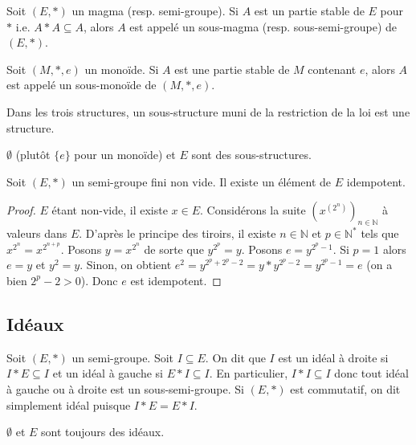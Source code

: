 \begin{definition}
Soit $(E, *)$ un magma (resp. semi-groupe).
Si $A$ est un partie stable de $E$ pour $*$ i.e. $A * A \subseteq A$,
alors $A$ est appelé un sous-magma (resp. sous-semi-groupe) de $(E, *)$.

Soit $(M, *, e)$ un monoïde.
Si $A$ est une partie stable de $M$ contenant $e$,
alors $A$ est appelé un sous-monoïde de $(M, *, e)$.

Dans les trois structures, un sous-structure muni de la restriction de la loi est une structure.
\end{definition}

\begin{exemple}
$\emptyset$ (plutôt $\{e\}$ pour un monoïde) et $E$ sont des sous-structures.
\end{exemple}

\begin{proposition}
Soit $(E, *)$ un semi-groupe fini non vide.
Il existe un élément de $E$ idempotent.
\end{proposition}

\begin{proof}
$E$ étant non-vide, il existe $x \in E$.
Considérons la suite $\left(x^{(2^n)}\right)_{n \in \mathbb{N}}$ à valeurs dans $E$.
D'après le principe des tiroirs, il existe $n \in \mathbb{N}$ et $p \in \mathbb{N}^*$ tels que
$x^{2^n} = x^{2^{n+p}}$.
Posons $y = x^{2^n}$ de sorte que $y^{2^p} = y$.
Posons $e = y^{2^p - 1}$.
Si $p = 1$ alors $e = y$ et $y^2 = y$.
Sinon, on obtient $e^2 = y^{2^p + 2^p - 2} = y * y^{2^p - 2} = y^{2^p - 1} = e$
(on a bien $2^p - 2 > 0$).
Donc $e$ est idempotent.
\end{proof}


\subsection{Idéaux}

\begin{definition}[Idéal]
Soit $(E, *)$ un semi-groupe.
Soit $I \subseteq E$. On dit que $I$ est
un idéal à droite si $I * E \subseteq I$
et un idéal à gauche si $E * I \subseteq I$.
En particulier, $I * I \subseteq I$
donc tout idéal à gauche ou à droite est un sous-semi-groupe.
Si $(E, *)$ est commutatif, on dit simplement idéal puisque $I*E = E*I$.
\end{definition}

\begin{exemple}
$\emptyset$ et $E$ sont toujours des idéaux.
\end{exemple}

